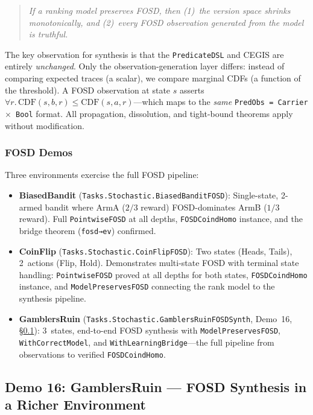 \documentclass[9pt,a4paper]{article}
\theoremstyle{plain}
\theoremstyle{definition}
\theoremstyle{remark}
\begin{document}
\begin{quote}
\textit{If a ranking model preserves FOSD, then (1)~the version space shrinks monotonically, and (2)~every FOSD observation generated from the model is truthful.}
\end{quote}

\noindent The key observation for synthesis is that the \texttt{PredicateDSL} and CEGIS are entirely \emph{unchanged}.  Only the observation-generation layer differs: instead of comparing expected traces (a scalar), we compare marginal CDFs (a function of the threshold).  A FOSD observation at state $s$ asserts $\forall r.\, \text{CDF}(s,b,r) \le \text{CDF}(s,a,r)$---which maps to the \emph{same} \texttt{PredObs = Carrier $\times$ Bool} format.  All propagation, dissolution, and tight-bound theorems apply without modification.

\subsubsection{FOSD Demos}

Three environments exercise the full FOSD pipeline:
\begin{itemize}
\item \textbf{BiasedBandit} (\texttt{Tasks.Stochastic.BiasedBanditFOSD}): Single-state, 2-armed bandit where ArmA ($2/3$ reward) FOSD-dominates ArmB ($1/3$ reward).  Full \texttt{PointwiseFOSD} at all depths, \texttt{FOSDCoindHomo} instance, and the bridge theorem (\texttt{fosd→ev}) confirmed.
\item \textbf{CoinFlip} (\texttt{Tasks.Stochastic.CoinFlipFOSD}): Two states (Heads, Tails), 2~actions (Flip, Hold).  Demonstrates multi-state FOSD with terminal state handling: \texttt{PointwiseFOSD} proved at all depths for both states, \texttt{FOSDCoindHomo} instance, and \texttt{ModelPreservesFOSD} connecting the rank model to the synthesis pipeline.
\item \textbf{GamblersRuin} (\texttt{Tasks.Stochastic.GamblersRuinFOSDSynth}, Demo~16, \S\ref{sec:e2e-gamblers-ruin-fosd}): 3~states, end-to-end FOSD synthesis with \texttt{ModelPreservesFOSD}, \texttt{WithCorrectModel}, and \texttt{WithLearningBridge}---the full pipeline from observations to verified \texttt{FOSDCoindHomo}.
\end{itemize}

\subsection{Demo 16: GamblersRuin --- FOSD Synthesis in a Richer Environment}
\label{sec:e2e-gamblers-ruin-fosd}
\end{document}
